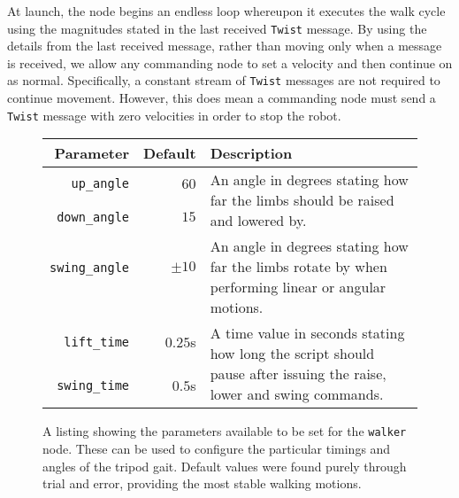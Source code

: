 At launch, the node begins an endless loop whereupon it executes the walk cycle using the magnitudes stated in the last received \texttt{Twist} message. By using the details from the last received message, rather than moving only when a message is received, we allow any commanding node to set a velocity and then continue on as normal. Specifically, a constant stream of \texttt{Twist} messages are not required to continue movement. However, this does mean a commanding node must send a \texttt{Twist} message with zero velocities in order to stop the robot. 

\begin{figure}[h!]
	\centering
	\begin{tabular}{ r r p{10cm} }
		\toprule
		\textbf{Parameter} & 
		\textbf{Default} & 
		\textbf{Description} \\
		\midrule

		\texttt{up\_angle} & 
		$60$\textdegree{} & 
		\multirow{2}{10cm}{An angle in degrees stating how far the limbs should be raised and lowered by.} \\

		\texttt{down\_angle} & 
		$15$\textdegree{} & \\

		\hline

		\texttt{swing\_angle} & 
		$\pm10$\textdegree{} & 
		\multirow{2}{10cm}{An angle in degrees stating how far the limbs rotate by when performing linear or angular motions.} \\

		& & \\
		
		\hline

		\texttt{lift\_time} & 
		$0.25$s & 
		\multirow{2}{10cm}{A time value in seconds stating how long the script should pause after issuing the raise, lower and swing commands.} \\

		\texttt{swing\_time} & 
		$0.5$s & 
		\\
		\bottomrule
	\end{tabular}
	\caption{A listing showing the parameters available to be set for the \texttt{walker} node. These can be used to configure the particular timings and angles of the tripod gait. Default values were found purely through trial and error, providing the most stable walking motions.}
	\label{fig:walker_params}
\end{figure}

